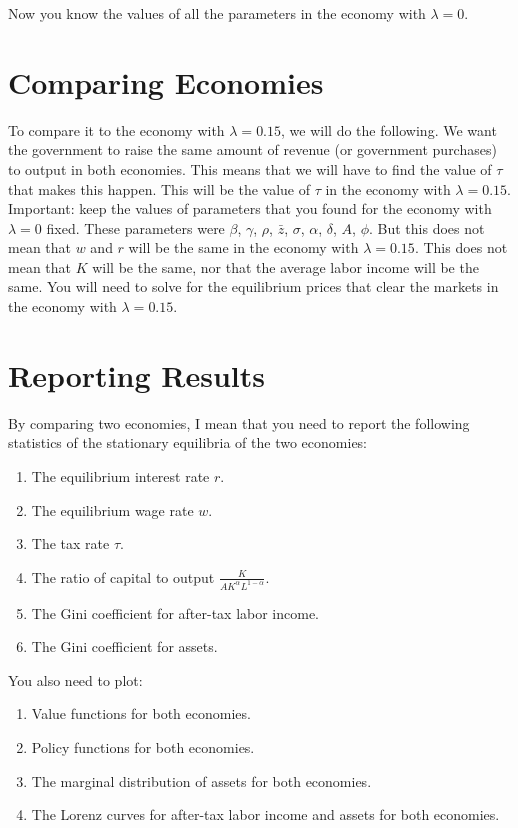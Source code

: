 \documentclass{article}
\begin{document}
Now you know the values of all the parameters in the economy with \(\lambda = 0\).

\section*{Comparing Economies}
To compare it to the economy with \(\lambda = 0.15\), we will do the following. We want the government to raise the same amount of revenue (or government purchases) to output in both economies. This means that we will have to find the value of \(\tau\) that makes this happen. This will be the value of \(\tau\) in the economy with \(\lambda = 0.15\). Important: keep the values of parameters that you found for the economy with \(\lambda = 0\) fixed. These parameters were \(\beta\), \(\gamma\), \(\rho\), \(\bar{z}\), \(\sigma\), \(\alpha\), \(\delta\), \(A\), \(\phi\). But this does not mean that \(w\) and \(r\) will be the same in the economy with \(\lambda = 0.15\). This does not mean that \(K\) will be the same, nor that the average labor income will be the same. You will need to solve for the equilibrium prices that clear the markets in the economy with \(\lambda = 0.15\).

\section*{Reporting Results}
By comparing two economies, I mean that you need to report the following statistics of the stationary equilibria of the two economies:

\begin{enumerate}
    \item The equilibrium interest rate \(r\).
    \item The equilibrium wage rate \(w\).
    \item The tax rate \(\tau\).
    \item The ratio of capital to output \(\frac{K}{A K^{\alpha} L^{1 - \alpha}}\).
    \item The Gini coefficient for after-tax labor income.
    \item The Gini coefficient for assets.
\end{enumerate}

You also need to plot:

\begin{enumerate}
    \item Value functions for both economies.
    \item Policy functions for both economies.
    \item The marginal distribution of assets for both economies.
    \item The Lorenz curves for after-tax labor income and assets for both economies.
\end{enumerate}
\end{document}
